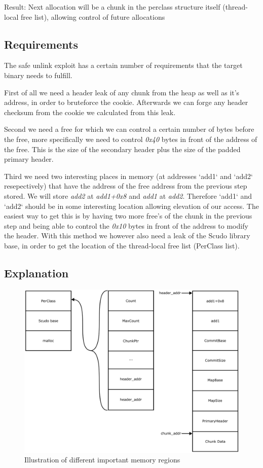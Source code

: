 \documentclass[a4paper,11pt,oneside]{report}
\begin{document}
Result: Next allocation will be a chunk in the perclass structure itself (thread-local
free list), allowing control of future allocations


\subsection{Requirements}

The safe unlink exploit has a certain number of requirements that the target binary needs
to fulfill.

First of all we need a header leak of any chunk from the heap as well as it's address, in
order to bruteforce the cookie. Afterwards we can forge any header checksum from the
cookie we calculated from this leak.

Second we need a free for which we can control a certain number of bytes before the free,
more specifically we need to control \emph{0x40} bytes in front of the address of the
free. This is the size of the secondary header plus the size of the padded primary header.

Third we need two interesting places in memory (at addresses `add1` and `add2`
resepectively) that have the address of the free address from the previous step stored. We
will store \emph{add2} at \emph{add1+0x8} and \emph{add1} at \emph{add2}. Therefore `add1`
and `add2` should be in some interesting location allowing elevation of our access.  The
easiest way to get this is by having two more free's of the chunk in the previous step and
being able to control the \emph{0x10} bytes in front of the address to modify the
header. With this method we however also need a leak of the Scudo library base, in order to
get the location of the thread-local free list (PerClass list).

\subsection{Explanation}

\begin{figure}[h!]
  \centering
  \includegraphics[width=\linewidth]{figures/SafeUnlinkMemory.png}
  \caption{Illustration of different important memory regions}
  \label{fig:SafeUnlinkMemory}
\end{figure}
\end{document}
